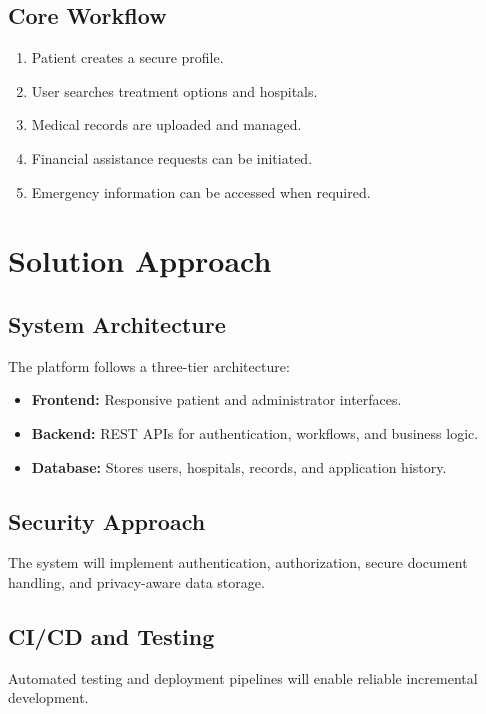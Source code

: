 \documentclass[12pt,a4paper]{article}
\begin{document}
\subsection{Core Workflow}

\begin{enumerate}
    \item Patient creates a secure profile.
    \item User searches treatment options and hospitals.
    \item Medical records are uploaded and managed.
    \item Financial assistance requests can be initiated.
    \item Emergency information can be accessed when required.
\end{enumerate}

\section{Solution Approach}

\subsection{System Architecture}

The platform follows a three-tier architecture:

\begin{itemize}
    \item \textbf{Frontend:} Responsive patient and administrator
    interfaces.
    \item \textbf{Backend:} REST APIs for authentication, workflows,
    and business logic.
    \item \textbf{Database:} Stores users, hospitals, records, and
    application history.
\end{itemize}

\subsection{Security Approach}

The system will implement authentication, authorization, secure
document handling, and privacy-aware data storage.

\subsection{CI/CD and Testing}

Automated testing and deployment pipelines will enable reliable
incremental development.
\end{document}
